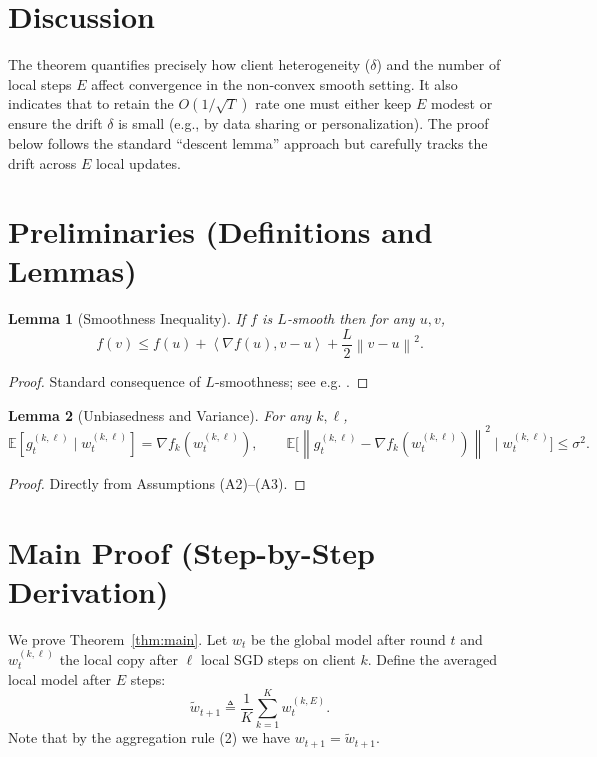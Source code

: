 \documentclass{article}
\newtheorem{lemma}{Lemma}
\newcommand{\E}{\mathbb{E}}
\newcommand{\norm}[1]{\left\lVert #1\right\rVert}
\newcommand{\ip}[2]{\left\langle #1,#2\right\rangle}
\begin{document}
\section*{Discussion}
The theorem quantifies precisely how client heterogeneity ($\delta$) and the number of local steps $E$ affect convergence in the non‑convex smooth setting. It also indicates that to retain the $O(1/\sqrt{T})$ rate one must either keep $E$ modest or ensure the drift $\delta$ is small (e.g., by data sharing or personalization). The proof below follows the standard “descent lemma” approach but carefully tracks the drift across $E$ local updates.

\section*{Preliminaries (Definitions and Lemmas)}
\begin{lemma}[Smoothness Inequality]\label{lem:smooth}
If $f$ is $L$‑smooth then for any $u,v$,
\[
f(v) \le f(u) + \ip{\nabla f(u)}{v-u} + \frac{L}{2}\norm{v-u}^2 .
\tag{L1}
\]
\end{lemma}
\begin{proof}
Standard consequence of $L$‑smoothness; see e.g. \cite{nesterov2004introductory}.
\end{proof}

\begin{lemma}[Unbiasedness and Variance]\label{lem:variance}
For any $k,\ell$,
\[
\E[g_{t}^{(k,\ell)}\mid w_{t}^{(k,\ell)}]=\nabla f_k(w_{t}^{(k,\ell)}),\qquad
\E\!\bigl[\norm{g_{t}^{(k,\ell)}-\nabla f_k(w_{t}^{(k,\ell)})}^2\mid w_{t}^{(k,\ell)}\bigr]\le\sigma^2 .
\tag{L2}
\]
\end{lemma}
\begin{proof}
Directly from Assumptions (A2)–(A3).
\end{proof}

\section*{Main Proof (Step-by-Step Derivation)}
We prove Theorem~\ref{thm:main}. Let $w_t$ be the global model after round $t$ and $w_{t}^{(k,\ell)}$ the local copy after $\ell$ local SGD steps on client $k$.  
Define the averaged local model after $E$ steps:
\[
\tilde w_{t+1}\triangleq \frac1K\sum_{k=1}^{K} w_{t}^{(k,E)} .
\tag{P1}
\]
Note that by the aggregation rule (2) we have $w_{t+1}= \tilde w_{t+1}$.
\end{document}
